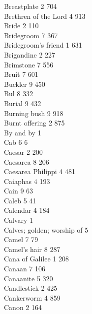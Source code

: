 Breastplate \hfill 2 \quad \phantom{0}704\\
Brethren of the Lord \hfill 4 \quad \phantom{0}913\\
Bride \hfill 2 \quad \phantom{0}110\\
Bridegroom \hfill 7 \quad \phantom{0}367\\
Bridegroom’s friend \hfill 1 \quad \phantom{0}631\\
Brigandine \hfill 2 \quad \phantom{0}227\\
Brimstone \hfill 7 \quad \phantom{0}556\\
Bruit \hfill 7 \quad \phantom{0}601\\
Buckler \hfill 9 \quad \phantom{0}450\\
Bul \hfill 8 \quad \phantom{0}332\\
Burial \hfill 9 \quad \phantom{0}432\\
Burning bush \hfill 9 \quad \phantom{0}918\\
Burnt offering \hfill 2 \quad \phantom{0}875\\
By and by \hfill 1 \\
Cab \hfill 6 \quad \phantom{0}\phantom{0}\phantom{0}6\\
Caesar \hfill 2 \quad \phantom{0}200\\
Caesarea \hfill 8 \quad \phantom{0}206\\
Caesarea Philippi \hfill 4 \quad \phantom{0}481\\
Caiaphas \hfill 4 \quad \phantom{0}193\\
Cain \hfill 9 \quad \phantom{0}\phantom{0}63\\
Caleb \hfill 5 \quad \phantom{0}\phantom{0}41\\
Calendar \hfill 4 \quad \phantom{0}184\\
Calvary \hfill 1 \\
Calves; golden; worship of \hfill 5 \\
Camel \hfill 7 \quad \phantom{0}\phantom{0}79\\
Camel’s hair \hfill 8 \quad \phantom{0}287\\
Cana of Galilee \hfill 1 \quad \phantom{0}208\\
Canaan \hfill 7 \quad \phantom{0}106\\
Canaanite \hfill 5 \quad \phantom{0}320\\
Candlestick \hfill 2 \quad \phantom{0}425\\
Cankerworm \hfill 4 \quad \phantom{0}859\\
Canon \hfill 2 \quad \phantom{0}164\\
